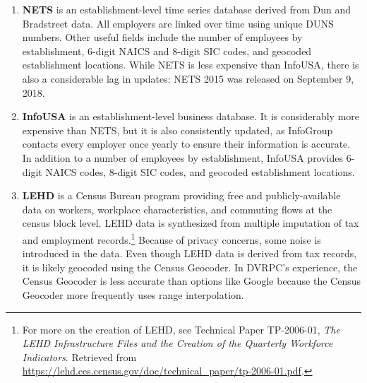 \documentclass[paper = letter, fontsize = 11pt]{scrartcl}
\begin{document}
\begin{enumerate}
	\item \textbf{NETS} is an establishment-level time series database derived from Dun and Bradstreet data. All employers are linked over time using unique DUNS numbers. Other useful fields include the number of employees by establishment, 6-digit NAICS and 8-digit SIC codes, and geocoded establishment locations. While NETS is less expensive than InfoUSA, there is also a considerable lag in updates: NETS 2015 was released on September 9, 2018.
	\item \textbf{InfoUSA} is an establishment-level business database. It is considerably more expensive than NETS, but it is also consistently updated, as InfoGroup contacts every employer once yearly to ensure their information is accurate. In addition to a number of employees by establishment, InfoUSA provides 6-digit NAICS codes, 8-digit SIC codes, and geocoded establishment locations.
	\item \textbf{LEHD} is a Census Bureau program providing free and publicly-available data on workers, workplace characteristics, and commuting flows at the census block level. LEHD data is synthesized from multiple imputation of tax and employment records.\footnote{For more on the creation of LEHD, see Technical Paper TP-2006-01, \textit{The LEHD Infrastructure Files and the Creation of the Quarterly Workforce Indicators}. Retrieved from \href{https://lehd.ces.census.gov/doc/technical_paper/tp-2006-01.pdf}{https://lehd.ces.census.gov/doc/technical\_paper/tp-2006-01.pdf}.} Because of privacy concerns, some noise is introduced in the data. Even though LEHD data is derived from tax records, it is likely geocoded using the Census Geocoder. In DVRPC's experience, the Census Geocoder is less accurate than options like Google because the Census Geocoder more frequently uses range interpolation.
\end{enumerate}
\end{document}
